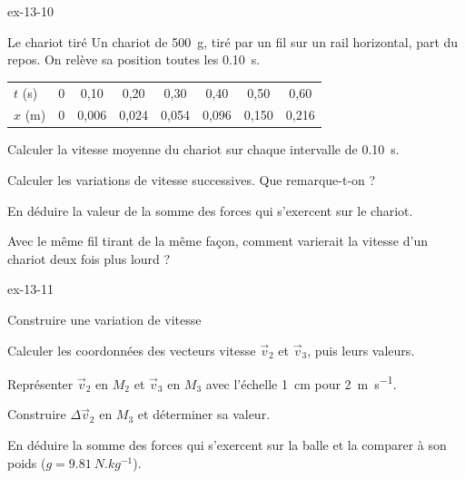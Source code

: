 \begin{blocLivre}{ex-13-10}
\begin{exercice}[2]{Le chariot tiré}
Un chariot de \qty{500}{g}, tiré par un fil sur un rail horizontal, part du repos. On relève sa position toutes les \qty{0,10}{s}.
\par\smallskip\noindent\hfill\begin{tabular}{lccccccc}
\toprule
$t$ (s) & 0 & 0,10 & 0,20 & 0,30 & 0,40 & 0,50 & 0,60 \\
$x$ (m) & 0 & 0,006 & 0,024 & 0,054 & 0,096 & 0,150 & 0,216 \\
\bottomrule
\end{tabular}\hfill\null\par\smallskip
\begin{questions}
\item Calculer la vitesse moyenne du chariot sur chaque intervalle de \qty{0,10}{s}.
\item Calculer les variations de vitesse successives. Que remarque-t-on ?
\item En déduire la valeur de la somme des forces qui s'exercent sur le chariot.
\item Avec le même fil tirant de la même façon, comment varierait la vitesse d'un chariot deux fois plus lourd ?
\end{questions}
\end{exercice}
\end{blocLivre}
\begin{blocLivre}{ex-13-11}
\begin{exercice}[2]{Construire une variation de vitesse}
\begin{questions}
\item Calculer les coordonnées des vecteurs vitesse $\vec{v}_2$ et $\vec{v}_3$, puis leurs valeurs.
\item Représenter $\vec{v}_2$ en $M_2$ et $\vec{v}_3$ en $M_3$ avec l'échelle \qty{1}{cm} pour \qty{2}{m.s^{-1}}.
\item Construire $\Delta\vec{v}_2$ en $M_3$ et déterminer sa valeur.
\item En déduire la somme des forces qui s'exercent sur la balle et la comparer à son poids ($g=\qty{9,81}{N.kg^{-1}}$).
\end{questions}
\end{exercice}
\end{blocLivre}
